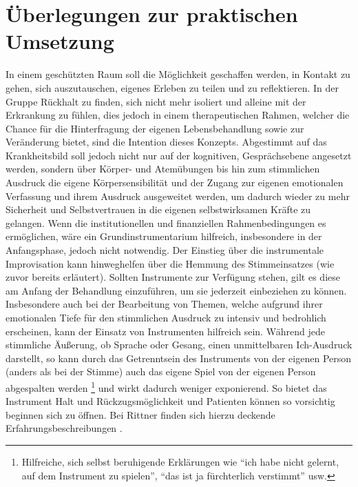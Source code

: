 \section{Überlegungen zur praktischen Umsetzung}
In einem geschützten Raum soll die Möglichkeit geschaffen werden, in Kontakt zu gehen, sich auszutauschen, eigenes Erleben zu teilen und zu reflektieren. In der Gruppe Rückhalt zu finden, sich nicht mehr isoliert und alleine mit der Erkrankung zu fühlen, dies jedoch in einem therapeutischen Rahmen, welcher die Chance für die Hinterfragung der eigenen Lebensbehandlung sowie zur Veränderung bietet, sind die Intention dieses Konzepts. Abgestimmt auf das Krankheitsbild soll jedoch nicht nur auf der kognitiven, Gesprächsebene angesetzt werden, sondern über Körper- und Atemübungen bis hin zum stimmlichen Ausdruck die eigene Körpersensibilität und der Zugang zur eigenen emotionalen Verfassung und ihrem Ausdruck ausgeweitet werden, um dadurch wieder zu mehr Sicherheit und Selbstvertrauen in die eigenen selbstwirksamen Kräfte zu gelangen. Wenn die institutionellen und finanziellen Rahmenbedingungen es ermöglichen, wäre ein Grundinstrumentarium hilfreich, insbesondere in der Anfangsphase, jedoch nicht notwendig. Der Einstieg über die instrumentale Improvisation kann hinweghelfen über die Hemmung des Stimmeinsatzes (wie zuvor bereits erläutert). Sollten Instrumente zur Verfügung stehen, gilt es diese am Anfang der Behandlung einzuführen, um sie jederzeit einbeziehen zu können. Insbesondere auch bei der Bearbeitung von Themen, welche aufgrund ihrer emotionalen Tiefe für den stimmlichen Ausdruck zu intensiv und bedrohlich erscheinen, kann der Einsatz von Instrumenten hilfreich sein. 
Während jede stimmliche Äußerung, ob Sprache oder Gesang, einen unmittelbaren Ich-Ausdruck darstellt, so kann durch das Getrenntsein des Instruments von der eigenen Person (anders als bei der Stimme) auch das eigene Spiel von der eigenen Person abgespalten werden \footnote{Hilfreiche, sich selbst beruhigende Erklärungen wie "`ich habe nicht gelernt, auf dem Instrument zu spielen"', "`das ist ja fürchterlich verstimmt"' usw.} und wirkt dadurch weniger exponierend. So bietet das Instrument Halt und Rückzugsmöglichkeit und Patienten können so vorsichtig beginnen sich zu öffnen. Bei Rittner finden sich hierzu deckende Erfahrungsbeschreibungen \autocite[vgl.][111]{rittner1990}.  



